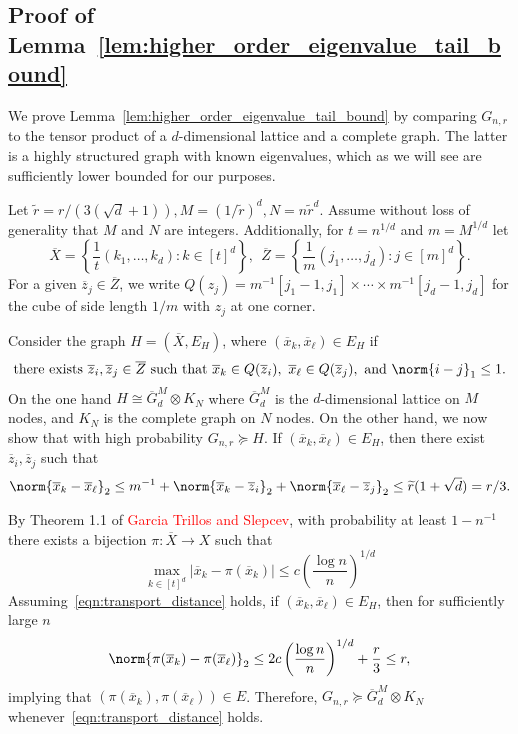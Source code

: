 \documentclass{article}
\newcommand{\abs}[1]{\left \lvert #1 \right \rvert}
\newcommand{\set}[1]{\left\{#1\right\}}
\newcommand{\1}{\mathbf{1}}
\newcommand{\wt}[1]{\widetilde{#1}}
\newcommand{\ol}[1]{\overline{#1}}
\theoremstyle{alden}
\theoremstyle{aldenthm}
\theoremstyle{definition}
\theoremstyle{remark}
\begin{document}
\subsection{Proof of Lemma~\ref{lem:higher_order_eigenvalue_tail_bound}}

We prove Lemma~\ref{lem:higher_order_eigenvalue_tail_bound} by comparing $G_{n,r}$ to the tensor product of a $d$-dimensional lattice and a complete graph. The latter is a highly structured graph with known eigenvalues, which as we will see are sufficiently lower bounded for our purposes.

Let $\wt{r} = r/(3(\sqrt{d} + 1)), M = (1/\wt{r})^d, N = n\wt{r}^d$. Assume without loss of generality that $M$ and $N$ are integers. Additionally, for $t = n^{1/d}$ and $m = M^{1/d}$ let 
\begin{equation*}
\overline{X} = \set{\frac{1}{t}(k_1,\ldots,k_d): k \in [t]^d},~~ \overline{Z} = \set{\frac{1}{m}(j_1,\ldots,j_d): j \in [m]^d}.
\end{equation*}
For a given $\overline{z}_j \in \overline{Z}$, we write $Q(z_j) = m^{-1}[j_1 - 1,j_1] \times \cdots \times m^{-1}[j_d - 1,j_d]$ for the cube of side length $1/m$ with $z_j$ at one corner. 

Consider the graph $H = (\overline{X}, E_H)$, where $(\ol{x}_k, \ol{x}_{\ell}) \in E_H$ if
\begin{equation*}
\textrm{there exists}~\ol{z}_i, \ol{z}_j \in \ol{Z}~\textrm{such that}~\ol{x}_k \in Q(\ol{z}_i),~ \ol{x}_\ell \in Q(\ol{z}_j),~\textrm{and}~\norm{i - j}_1 \leq 1.
\end{equation*}
On the one hand $H \cong \ol{G}^M_d \otimes K_N$ where $\ol{G}^M_d$ is the $d$-dimensional lattice on $M$ nodes, and $K_N$ is the complete graph on $N$ nodes. On the other hand, we now show that with high probability $G_{n,r} \succeq H$. If $(\ol{x}_k, \ol{x}_{\ell}) \in E_H$, then there exist $\ol{z}_i, \ol{z}_j$ such that
\begin{equation*}
\norm{\ol{x}_k - \ol{x}_{\ell}}_2 \leq m^{-1} + \norm{\ol{x}_k - \ol{z}_{i}}_2 + \norm{\ol{x}_{\ell} - \ol{z}_{j}}_2 \leq \wt{r}(1 + \sqrt{d}) = r/3.
\end{equation*}

By Theorem 1.1 of \textcolor{red}{Garcia Trillos and Slepcev}, with probability at least $1 - n^{-1}$ there exists a bijection $\pi: \overline{X} \to X$ such that
\begin{equation}
\label{eqn:transport_distance}
\max_{k \in [t]^d} \abs{\overline{x}_k - \pi(\overline{x}_k)} \leq c \left(\frac{\log n}{n}\right)^{1/d}
\end{equation}
Assuming~\eqref{eqn:transport_distance} holds, if $(\ol{x}_k, \ol{x}_{\ell}) \in E_H$, then for sufficiently large $n$
\begin{equation*}
\norm{\pi(\ol{x}_k) - \pi(\ol{x}_\ell)}_2 \leq 2 c \left(\frac{\log n}{n}\right)^{1/d} + \frac{r}{3} \leq r,
\end{equation*}
implying that $(\pi(\ol{x}_k), \pi(\ol{x}_{\ell})) \in E$. Therefore, $G_{n,r} \succeq \ol{G}^M_d \otimes K_N$ whenever~\eqref{eqn:transport_distance} holds.
\end{document}
